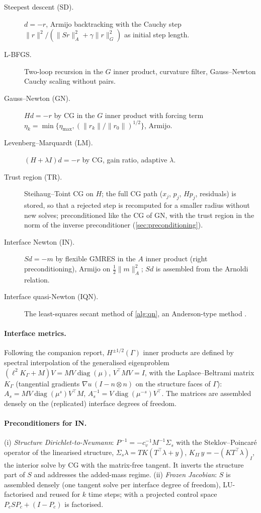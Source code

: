 \documentclass[11pt,a4paper]{article}
\theoremstyle{definition}
\theoremstyle{remark}
\newcommand{\G}{\Gamma}
\newcommand{\M}{M}
\begin{document}
\begin{description}
\item[Steepest descent (SD).] $d=-r$, Armijo backtracking with the Cauchy step
$\|r\|^2/(\|Sr\|_A^2+\gamma\|r\|_G^2)$ as initial step length.
\item[L-BFGS.] Two-loop recursion in the $G$ inner product, curvature filter, Gauss--Newton Cauchy
scaling without pairs.
\item[Gauss--Newton (GN).] $Hd=-r$ by CG in the $G$ inner product with forcing term
$\eta_k=\min\{\eta_{\max},(\|r_k\|/\|r_0\|)^{1/2}\}$, Armijo.
\item[Levenberg--Marquardt (LM).] $(H+\lambda I)d=-r$ by CG, gain ratio, adaptive $\lambda$.
\item[Trust region (TR).] Steihaug--Toint CG \cite{Steihaug1983} on $H$; the full CG path ($x_j$, $p_j$, $Hp_j$,
residuals) is stored, so that a rejected step is recomputed for a smaller radius without new
solves; preconditioned like the CG of GN, with the trust region in the norm of the inverse
preconditioner (\cref{sec:preconditioning}).
\item[Interface Newton (IN).] $Sd=-m$ by flexible GMRES in the $A$ inner product (right
preconditioning), Armijo on $\tfrac12\|m\|_A^2$; $Sd$ is assembled from the Arnoldi relation.
\item[Interface quasi-Newton (IQN).] The least-squares secant method of \cref{alg:qn}, an
Anderson-type method \cite{WalkerNi2011}.
\end{description}

\paragraph{Interface metrics.} Following the companion report, $H^{\pm1/2}(\G)$ inner products are
defined by spectral interpolation of the generalised eigenproblem
$(\ell^2K_\G+\M)V = \M V\operatorname{diag}(\mu)$, $V^{\top}\M V=I$, with the Laplace--Beltrami
matrix $K_\G$ (tangential gradients $\nabla u\,(I-n\otimes n)$ on the structure faces of $\G$):
$A_s = \M V\operatorname{diag}(\mu^s)V^{\top}\M$, $A_s^{-1}=V\operatorname{diag}(\mu^{-s})V^{\top}$.
The matrices are assembled densely on the (replicated) interface degrees of freedom.

\paragraph{Preconditioners for IN.}
(i) \emph{Structure Dirichlet-to-Neumann}: $P^{-1} = -c_v^{-1}\M^{-1}\Sigma_s$ with the
Steklov--Poincar\'e operator of the linearised structure,
$\Sigma_s\lambda = T K(T^{\top}\lambda + y)$, $K_{II}\,y = -(KT^{\top}\lambda)_I$, the interior
solve by CG with the matrix-free tangent. It inverts the structure part of $S$ and addresses the
added-mass regime.
(ii) \emph{Frozen Jacobian}: $S$ is assembled densely (one tangent solve per interface degree of
freedom), LU-factorised and reused for $k$ time steps; with a projected control space
$P_cSP_c+(I-P_c)$ is factorised.
\end{document}
